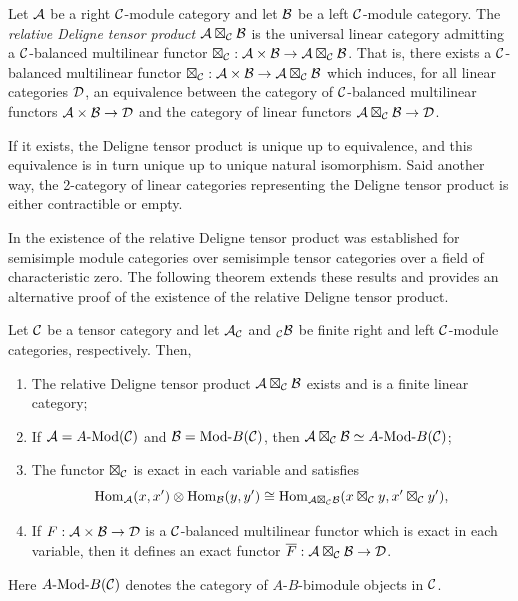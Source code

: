 \documentclass{amsart}
\begin{document}
\begin{definition}
	Let $\mathcal A$ be a right $\mathcal C$-module category and let $\mathcal B$ be a left $\mathcal C$-module category. The {\em relative Deligne tensor product $\mathcal A \boxtimes_{\mathcal C} \mathcal B$} is the universal linear category admitting a $\mathcal C$-balanced multilinear functor $\boxtimes_{\mathcal C}: \mathcal A \times \mathcal B \to \mathcal A \boxtimes_{\mathcal C} \mathcal B$. That is, there exists a $\mathcal C$-balanced multilinear functor $\boxtimes_{\mathcal C}: \mathcal A \times \mathcal B \to \mathcal A \boxtimes_{\mathcal C} \mathcal B$ which induces, for all linear categories $\mathcal D$, an equivalence between the category of $\mathcal C$-balanced multilinear functors $\mathcal A \times \mathcal B \to \mathcal D$ and the category of linear functors $\mathcal A \boxtimes_{\mathcal C} \mathcal B \to \mathcal D$. 
\end{definition}

If it exists, the Deligne tensor product is unique up to equivalence, and this equivalence is in turn unique up to unique natural isomorphism. Said another way, the 2-category of linear categories representing the Deligne tensor product is either contractible or empty. 

In \cite{0909.3140} the existence of the relative Deligne tensor product was established for semisimple module categories over semisimple tensor categories over a field of characteristic zero. The following theorem extends these results and provides an alternative proof of the existence of the relative Deligne tensor product.   

\begin{maintheorem} \label{thm:DelignePrdtOverATCExists}
	Let $\mathcal C$ be a tensor category and let $\mathcal A_{\mathcal C}$ and ${}_{\mathcal C}\mathcal B$ be finite right and left $\mathcal C$-module categories, respectively. Then,
	\begin{enumerate}
		\item The relative Deligne tensor product $\mathcal A \boxtimes_{\mathcal C} \mathcal B$ exists and is a finite linear category;
		\item If $\cA = \Mod{A}{}(\cC)$ and $\cB = \Mod{}{B}(\cC)$, then $\cA \boxtimes_{\cC} \cB \simeq \Mod{A }{B}(\cC)$;

		\item The functor $\boxtimes_{\mathcal C}$ is exact in each variable and satisfies 
		\begin{equation*}
			\operatorname{Hom}_{\mathcal A}(x,x') \otimes \operatorname{Hom}_{\mathcal B}(y, y') \cong \operatorname{Hom}_{\mathcal A \boxtimes_{\mathcal C} \mathcal B} (x \boxtimes_{\mathcal C} y, x' \boxtimes_{\mathcal C} y'),
		\end{equation*}
		\item If $F: \mathcal A \times \mathcal B \to \mathcal D$ is a $\mathcal C$-balanced multilinear functor which is exact in each variable, then it defines an exact functor $\overline{F}: \mathcal A \boxtimes_{\mathcal C} \mathcal B \to \mathcal D$. 
	\end{enumerate} 
\nid Here $\Mod{A}{B}(\cC)$ denotes the category of $A$-$B$-bimodule objects in $\mathcal C$.	
\end{maintheorem}
\end{document}
